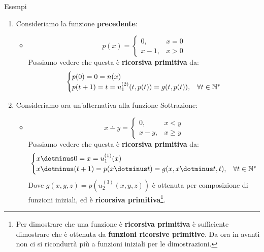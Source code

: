 \begin{generalbox}[colframe=azure-gradient-3!90!black]{Esempi}
\begin{enumerate}
\begin{itemize}
\begin{equation}
        \begin{cases}
          0! =1=s(0)\\
          (t+1)! =(t+1)\cdot t! =m(t+1, t!)=g(t+1,t!), & \forall t \in \mbN^*
        \end{cases}
      \end{equation}
    \end{itemize}
    \item Consideriamo la funzione \textbf{precedente}:
    \begin{itemize}
     \item []
     \begin{equation}
        p(x)=\begin{cases}
              0, &  x=0\\
              x-1, & x>0
            \end{cases}
      \end{equation}
      Possiamo vedere che questa è \textbf{ricorsiva primitiva} da:
      \begin{equation}
        \begin{cases}
          p(0)=0=n(x)\\
          p(t+1)=t=u_1^{(2)}(t,p(t))=g(t, p(t)), & \forall t \in \mathbb{N}^*
        \end{cases}
      \end{equation}
    \end{itemize}
    \item Consideriamo ora un'alternativa alla funzione Sottrazione:
    \begin{itemize}
     \item []
      \begin{equation}
        x\dotminus y =  \begin{cases}
                          0, & x<y \\
                          x-y, & x\geq y
                        \end{cases}
      \end{equation}
      Possiamo vedere che questa è \textbf{ricorsiva primitiva} da:
      \begin{equation}
        \begin{cases}
          x\dotminus 0=x=u_1^{(1)}(x)\\
          x\dotminus (t+1)=p(x\dotminus t)=g(x, x\dotminus t,t), & \forall t \in \mbN^*
        \end{cases}
      \end{equation}
      Dove \(g(x,y,z)=p(u_2^{(3)}(x,y,z))\) è ottenuta per composizione di funzioni iniziali, ed è \textbf{ricorsiva primitiva}\footnote{Per dimostrare che una funzione è \textbf{ricorsiva primitiva} è sufficiente dimostrare che è ottenuta da \textbf{funzioni ricorsive primitive}. Da ora in avanti non ci si ricondurrà più a funzioni iniziali per le dimostrazioni.}.

\end{itemize}
\end{enumerate}
\end{generalbox}

